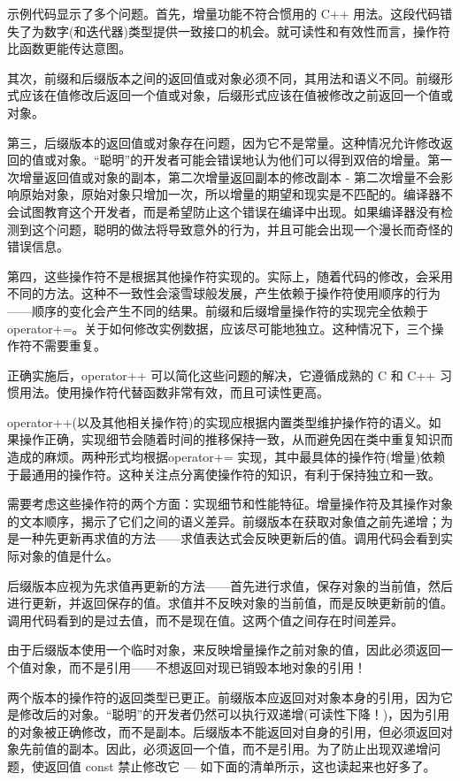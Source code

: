 
示例代码显示了多个问题。首先，增量功能不符合惯用的 C++ 用法。这段代码错失了为数字(和迭代器)类型提供一致接口的机会。就可读性和有效性而言，操作符比函数更能传达意图。

其次，前缀和后缀版本之间的返回值或对象必须不同，其用法和语义不同。前缀形式应该在值修改后返回一个值或对象，后缀形式应该在值被修改之前返回一个值或对象。

第三，后缀版本的返回值或对象存在问题，因为它不是常量。这种情况允许修改返回的值或对象。“聪明”的开发者可能会错误地认为他们可以得到双倍的增量。第一次增量返回值或对象的副本，第二次增量返回副本的修改副本 - 第二次增量不会影响原始对象，原始对象只增加一次，所以增量的期望和现实是不匹配的。编译器不会试图教育这个开发者，而是希望防止这个错误在编译中出现。如果编译器没有检测到这个问题，聪明的做法将导致意外的行为，并且可能会出现一个漫长而奇怪的错误信息。

第四，这些操作符不是根据其他操作符实现的。实际上，随着代码的修改，会采用不同的方法。这种不一致性会滚雪球般发展，产生依赖于操作符使用顺序的行为——顺序的变化会产生不同的结果。前缀和后缀增量操作符的实现完全依赖于 operator+=。关于如何修改实例数据，应该尽可能地独立。这种情况下，三个操作符不需要重复。


正确实施后，operator++ 可以简化这些问题的解决，它遵循成熟的 C 和 C++ 习惯用法。使用操作符代替函数非常有效，而且可读性更高。

operator++(以及其他相关操作符)的实现应根据内置类型维护操作符的语义。如果操作正确，实现细节会随着时间的推移保持一致，从而避免因在类中重复知识而造成的麻烦。两种形式均根据operator+= 实现，其中最具体的操作符(增量)依赖于最通用的操作符。这种关注点分离使操作符的知识，有利于保持独立和一致。

需要考虑这些操作符的两个方面：实现细节和性能特征。增量操作符及其操作对象的文本顺序，揭示了它们之间的语义差异。前缀版本在获取对象值之前先递增；为是一种先更新再求值的方法——求值表达式会反映更新后的值。调用代码会看到实际对象的值是什么。

后缀版本应视为先求值再更新的方法——首先进行求值，保存对象的当前值，然后进行更新，并返回保存的值。求值并不反映对象的当前值，而是反映更新前的值。调用代码看到的是过去值，而不是现在值。这两个值之间存在时间差异。

由于后缀版本使用一个临时对象，来反映增量操作之前对象的值，因此必须返回一个值对象，而不是引用——不想返回对现已销毁本地对象的引用！

两个版本的操作符的返回类型已更正。前缀版本应返回对对象本身的引用，因为它是修改后的对象。“聪明”的开发者仍然可以执行双递增(可读性下降！)，因为引用的对象被正确修改，而不是副本。后缀版本不能返回对自身的引用，但必须返回对象先前值的副本。因此，必须返回一个值，而不是引用。为了防止出现双递增问题，使返回值 const 禁止修改它 — 如下面的清单所示，这也读起来也好多了。

